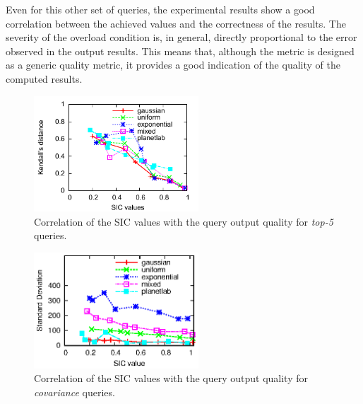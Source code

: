 Even for this other set of queries, the experimental results show a good correlation between the achieved
\sic values and the correctness of the results. The severity of the overload condition is, in general,
directly proportional to the error observed in the output results. This means that, although the \sic
metric is designed as a generic quality metric, it provides a good indication of the quality of the
computed results.
\begin{figure}[h!]
\centering 
\includegraphics[width=0.55\textwidth]{img/tesi/topK-distance}
\caption{Correlation of the SIC values with the query output quality for \emph{top-5} queries.}
\label{fig:top5}
\end{figure}
\clearpage
\begin{figure}[h!]
\centering
\includegraphics[width=0.55\textwidth]{img/tesi/cov}
\caption{Correlation of the SIC values with the query output quality for \emph{covariance} queries.}
\label{fig:cov}
\end{figure}%
